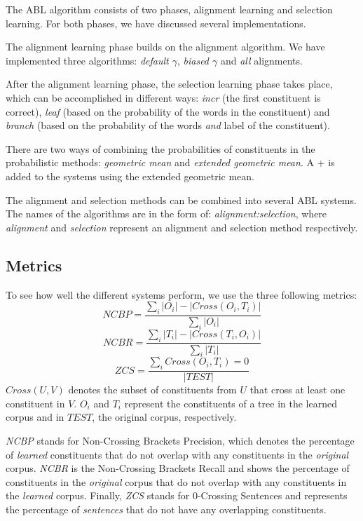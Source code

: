 \documentclass[letterpaper,mlapa]{article}
\begin{document}
The ABL algorithm consists of two phases, alignment learning and selection
learning. For both phases, we have discussed several implementations.

The alignment learning phase builds on the alignment algorithm. We have
implemented three algorithms: \emph{default $\gamma$}, \emph{biased $\gamma$}
and \emph{all} alignments.

After the alignment learning phase, the selection learning phase takes place,
which can be accomplished in different ways: \emph{incr} (the first constituent
is correct), \emph{leaf} (based on the probability of the words in the
constituent) and \emph{branch} (based on the probability of the words
\emph{and} label of the constituent).

There are two ways of combining the probabilities of constituents in the
probabilistic methods: \emph{geometric mean} and \emph{extended geometric
mean}. A + is added to the systems using the extended geometric mean.

The alignment and selection methods can be combined into several ABL systems.
The names of the algorithms are in the form of: \emph{alignment:selection},
where \emph{alignment} and \emph{selection} represent an alignment and
selection method respectively.


\subsection{Metrics}
\label{s:metrics}

To see how well the different systems perform, we use the three following
metrics:
\[NCBP=\frac{\sum_i|O_i|-|Cross(O_i, T_i)|}{\sum_i|O_i|}\]
\[NCBR=\frac{\sum_i|T_i|-|Cross(T_i, O_i)|}{\sum_i|T_i|}\]
\[ZCS=\frac{\sum_i Cross(O_i, T_i)=0}{|TEST|}\]
$Cross(U, V)$ denotes the subset of constituents from $U$ that cross at least
one constituent in $V$. $O_i$ and $T_i$ represent the constituents of a tree in
the learned corpus and in $TEST$, the original corpus, respectively.
\cite{bib:led}

\emph{NCBP} stands for Non-Crossing Brackets Precision, which denotes the
percentage of \emph{learned} constituents that do not overlap with any
constituents in the \emph{original} corpus. \emph{NCBR} is the Non-Crossing
Brackets Recall and shows the percentage of constituents in the \emph{original}
corpus that do not overlap with any constituents in the \emph{learned} corpus.
Finally, \emph{ZCS} stands for 0-Crossing Sentences and represents the
percentage of \emph{sentences} that do not have any overlapping constituents.
 
\end{document}
